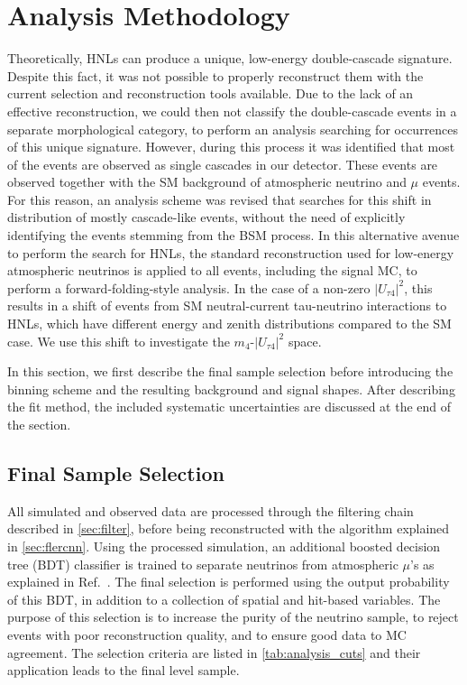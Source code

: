 \documentclass[
    aps,
    prd,
    reprint,
    amsmath,
    amssymb,
    nofootinbib,
    superscriptaddress,
    floatfix
]{revtex4-2}
\def\ut4{$|U_{\tau4}|^2$}
\begin{document}

\section{\label{sec:analysis_methods}Analysis Methodology}

Theoretically, HNLs can produce a unique, low-energy double-cascade signature. Despite this fact, it was not possible to properly reconstruct them with the current selection and reconstruction tools available. Due to the lack of an effective reconstruction, we could then not classify the double-cascade events in a separate morphological category, to perform an analysis searching for occurrences of this unique signature. However, during this process it was identified that most of the events are observed as single cascades in our detector.
These events are observed together with the SM background of atmospheric neutrino and $\mu$ events. For this reason, an analysis scheme was revised that searches for this shift in distribution of mostly cascade-like events, without the need of explicitly identifying the events stemming from the BSM process.
In this alternative avenue to perform the search for HNLs, the standard reconstruction used for low-energy atmospheric neutrinos is applied to all events, including the signal MC, to perform a forward-folding-style analysis. %
In the case of a non-zero \ut4, this results in a shift of events from SM neutral-current tau-neutrino interactions to HNLs, which have different energy and zenith distributions compared to the SM case. We use this shift to investigate the $m_4$-\ut4 space.

In this section, we first describe the final sample selection before introducing the binning scheme and the resulting background and signal shapes. After describing the fit method, the included systematic uncertainties are discussed at the end of the section.


\subsection{\label{sec:sample}Final Sample Selection}

All simulated and observed data are processed through the filtering chain described in \cref{sec:filter}, before being reconstructed with the algorithm explained in \cref{sec:flercnn}.
Using the processed simulation, an additional boosted decision tree (BDT) classifier is trained to separate neutrinos from atmospheric $\mu$'s as explained in Ref.~\cite{IceCube:2024xjj}.
The final selection is performed using the output probability of this BDT, in addition to a collection of spatial and hit-based variables.
The purpose of this selection is to increase the purity of the neutrino sample, to reject events with poor reconstruction quality, and to ensure good data to MC agreement.
The selection criteria are listed in \cref{tab:analysis_cuts} and their application leads to the final level sample.
\end{document}
